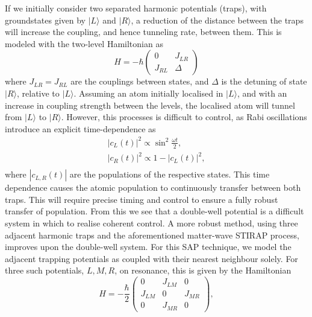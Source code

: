 If we initially consider two separated harmonic potentials (traps), with groundstates given by $| L \rangle$ and $| R \rangle$, a reduction of the distance between the traps will increase the coupling, and hence tunneling rate, between them. This is modeled with the two-level Hamiltonian as
\begin{equation}
    H = -\hbar
    \begin{pmatrix}
        0 & J_{LR} \\
        J_{RL} & \Delta
    \end{pmatrix}
\end{equation}
where $J_{LR} = J_{RL}$ are the couplings between states, and $\Delta$ is the detuning of state $| R \rangle$, relative to $| L \rangle$. Assuming an atom initially localised in $| L \rangle$, and with an increase in coupling strength between the levels, the localised atom will tunnel from $| L \rangle$ to $| R \rangle $. However, this processes is difficult to control, as Rabi oscillations introduce an explicit time-dependence as
\begin{subequations}
\begin{align}
    |c_L(t)|^2 \propto \sin^2 \frac{\omega t}{2} ,\\
    |c_R(t)|^2 \propto 1 - |c_L(t)|^2, \\
\end{align}
\end{subequations}
where $|c_{L,R}(t)|$ are the populations of the respective states. This time dependence causes the atomic population to continuously transfer between both traps. This will require precise timing and control to ensure a fully robust transfer of population. From this we see that a double-well potential is a difficult system in which to realise coherent control. A more robust method, using three adjacent harmonic traps and the aforementioned matter-wave STIRAP process, improves upon the double-well system. For this SAP technique, we model the adjacent trapping potentials as coupled with their nearest neighbour solely. For three such potentials, $L,M,R$, on resonance, this is given by the Hamiltonian
\begin{equation}\label{eqn:sap_ham}
    H = -\frac{\hbar}{2}
    \begin{pmatrix}
        0 & J_{LM} & 0 \\
        J_{LM} & 0 & J_{MR} \\
        0 & J_{MR} & 0
    \end{pmatrix},
\end{equation}
